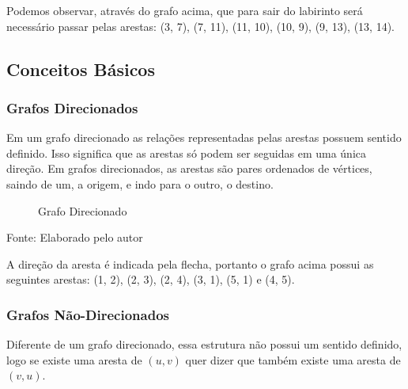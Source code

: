 Podemos observar, através do grafo acima, que para sair do labirinto será necessário passar pelas arestas: (3, 7), (7, 11), (11, 10), (10, 9), (9, 13), (13, 14). 

\subsection{Conceitos Básicos}

\subsubsection{Grafos Direcionados}
Em um grafo direcionado as relações representadas pelas arestas possuem sentido definido. Isso significa que as arestas só podem ser seguidas em uma única direção. Em grafos direcionados, as arestas são pares ordenados de vértices, saindo de um, a origem, e indo para o outro, o destino.

\begin{figure}[h]
    \caption{Grafo Direcionado}
    \centering
\end{figure}
\begin{center}
    Fonte: Elaborado pelo autor
\end{center}

A direção da aresta é indicada pela flecha, portanto o grafo acima possui as seguintes arestas: (1, 2), (2, 3), (2, 4), (3, 1), (5, 1) e (4, 5).

\subsubsection{Grafos Não-Direcionados}
Diferente de um grafo direcionado, essa estrutura não possui um sentido definido, logo se existe uma aresta de $(u, v)$ quer dizer que também existe uma aresta de $(v, u)$.

